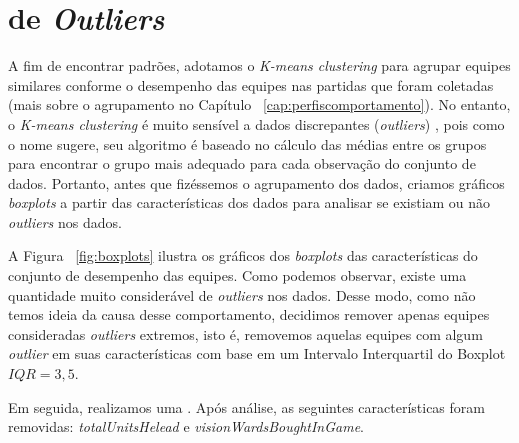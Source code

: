 \section{ de \textit{Outliers}}

A fim de encontrar padrões, adotamos o \textit{K-means clustering} para agrupar equipes similares conforme o desempenho das equipes nas partidas que foram coletadas (mais sobre o agrupamento no Capítulo ~\ref{cap:perfiscomportamento}). No entanto, o \textit{K-means clustering} é muito sensível a dados discrepantes (\textit{outliers}) \cite{gan2017k}, pois como o nome sugere, seu algoritmo é baseado no cálculo das médias entre os grupos para encontrar o grupo mais adequado para cada observação do conjunto de dados. Portanto, antes que fizéssemos o agrupamento dos dados, criamos gráficos \textit{boxplots} a partir das características dos dados para analisar se existiam ou não \textit{outliers} nos dados.


A Figura ~\ref{fig:boxplots} ilustra os gráficos dos \textit{boxplots} das caracter\'isticas do conjunto de desempenho das equipes. Como podemos observar, existe uma quantidade muito considerável de \textit{outliers} nos dados. Desse modo, como não temos ideia da causa desse comportamento, decidimos remover apenas equipes consideradas \textit{outliers} extremos, isto é, removemos aquelas equipes com algum \textit{outlier} em suas caracter\'isticas com base em um Intervalo Interquartil do Boxplot $IQR = 3,5$.

Em seguida, realizamos uma . Após  análise, as seguintes características  foram removidas: \textit{totalUnitsHelead} e \textit{visionWardsBoughtInGame}.

